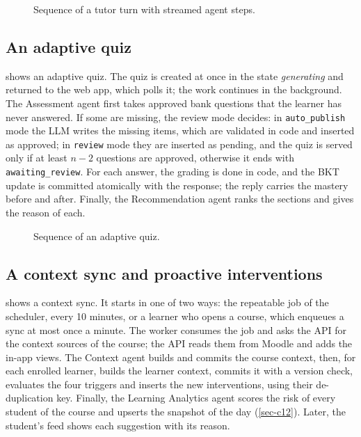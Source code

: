 \begin{figure}[htbp]
  \centering
  \caption{Sequence of a tutor turn with streamed agent steps.}
  \label{fig-seq-tutor}
\end{figure}

\subsection{An adaptive quiz}

 shows an adaptive quiz. The quiz is created at once
in the state \emph{generating} and returned to the web app, which polls
it; the work continues in the background. The Assessment agent first takes
approved bank questions that the learner has never answered. If some are
missing, the review mode decides: in \texttt{auto\_publish} mode the LLM
writes the missing items, which are validated in code and inserted as
approved; in \texttt{review} mode they are inserted as pending, and the
quiz is served only if at least $n-2$ questions are approved, otherwise it
ends with \texttt{awaiting\_review}. For each answer, the grading is done
in code, and the BKT update is committed atomically with the response;
the reply carries the mastery before and after. Finally, the
Recommendation agent ranks the sections and gives the reason of each.

\begin{figure}[htbp]
  \centering
  \caption{Sequence of an adaptive quiz.}
  \label{fig-seq-quiz}
\end{figure}

\subsection{A context sync and proactive interventions}

 shows a context sync. It starts in one of two
ways: the repeatable job of the scheduler, every 10 minutes, or a learner
who opens a course, which enqueues a sync at most once a minute. The
worker consumes the job and asks the API for the context sources of the
course; the API reads them from Moodle and adds the in-app views. The
Context agent builds and commits the course context, then, for each
enrolled learner, builds the learner context, commits it with a version
check, evaluates the four triggers and inserts the new interventions,
using their de-duplication key. Finally, the Learning Analytics agent
scores the risk of every student of the course and upserts the
snapshot of the day (\cref{sec-c12}). Later, the student's feed shows
each suggestion with its reason.

